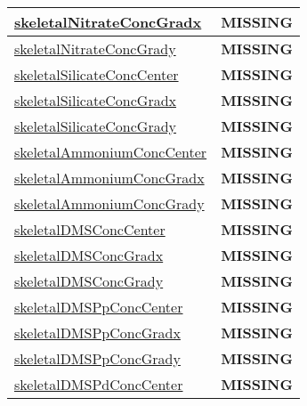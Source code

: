 {\begin{center}
\begin{longtable}{| p{2.0in} | p{4.0in} |}
    \hline
    \hyperref[subsec:var_sec_tracer_reconstruction_skeletalNitrateConcGradx]{skeletalNitrateConcGradx} & {\bf \color{red} MISSING} \\
    \hline
    \hyperref[subsec:var_sec_tracer_reconstruction_skeletalNitrateConcGrady]{skeletalNitrateConcGrady} & {\bf \color{red} MISSING} \\
    \hline
    \hyperref[subsec:var_sec_tracer_reconstruction_skeletalSilicateConcCenter]{skeletalSilicateConcCenter} & {\bf \color{red} MISSING} \\
    \hline
    \hyperref[subsec:var_sec_tracer_reconstruction_skeletalSilicateConcGradx]{skeletalSilicateConcGradx} & {\bf \color{red} MISSING} \\
    \hline
    \hyperref[subsec:var_sec_tracer_reconstruction_skeletalSilicateConcGrady]{skeletalSilicateConcGrady} & {\bf \color{red} MISSING} \\
    \hline
    \hyperref[subsec:var_sec_tracer_reconstruction_skeletalAmmoniumConcCenter]{skeletalAmmoniumConcCenter} & {\bf \color{red} MISSING} \\
    \hline
    \hyperref[subsec:var_sec_tracer_reconstruction_skeletalAmmoniumConcGradx]{skeletalAmmoniumConcGradx} & {\bf \color{red} MISSING} \\
    \hline
    \hyperref[subsec:var_sec_tracer_reconstruction_skeletalAmmoniumConcGrady]{skeletalAmmoniumConcGrady} & {\bf \color{red} MISSING} \\
    \hline
    \hyperref[subsec:var_sec_tracer_reconstruction_skeletalDMSConcCenter]{skeletalDMSConcCenter} & {\bf \color{red} MISSING} \\
    \hline
    \hyperref[subsec:var_sec_tracer_reconstruction_skeletalDMSConcGradx]{skeletalDMSConcGradx} & {\bf \color{red} MISSING} \\
    \hline
    \hyperref[subsec:var_sec_tracer_reconstruction_skeletalDMSConcGrady]{skeletalDMSConcGrady} & {\bf \color{red} MISSING} \\
    \hline
    \hyperref[subsec:var_sec_tracer_reconstruction_skeletalDMSPpConcCenter]{skeletalDMSPpConcCenter} & {\bf \color{red} MISSING} \\
    \hline
    \hyperref[subsec:var_sec_tracer_reconstruction_skeletalDMSPpConcGradx]{skeletalDMSPpConcGradx} & {\bf \color{red} MISSING} \\
    \hline
    \hyperref[subsec:var_sec_tracer_reconstruction_skeletalDMSPpConcGrady]{skeletalDMSPpConcGrady} & {\bf \color{red} MISSING} \\
    \hline
    \hyperref[subsec:var_sec_tracer_reconstruction_skeletalDMSPdConcCenter]{skeletalDMSPdConcCenter} & {\bf \color{red} MISSING} \\

\end{longtable}
\end{center}}
